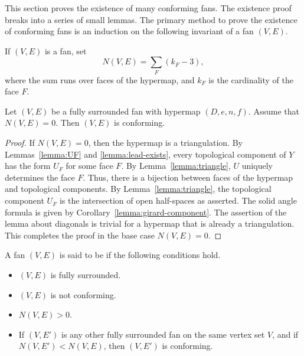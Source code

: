 This section proves the existence of many conforming fans.  The
existence proof breaks into a series of small lemmas.  The primary
method to prove the existence of conforming fans is an induction on
the following invariant of a fan $(V,E)$.

\begin{definition}[$N(V,E)$]
If $(V,E)$ is a fan,  set
\begin{displaymath}
N(V,E) = \sum_F (k_F - 3),
\end{displaymath}
where the sum runs over faces of the hypermap, and $k_F$ is the
cardinality of the face $F$.
\end{definition}

\begin{lemma}\label{lemma:N=0}
Let $(V,E)$ be a fully surrounded fan with hypermap $(D,e,n,f)$. 
Assume that $N(V,E)=0$.
Then $(V,E)$ is conforming.
\end{lemma}
%
%
%

\begin{proof}
If $N(V,E)=0$, then the hypermap is a triangulation.  By
Lemmas~\ref{lemma:UF} and \ref{lemma:lead-exists}, every topological
component of $Y$ has the form $U_F$ for some face $F$.  By
Lemma~\ref{lemma:triangle}, $U$ uniquely determines the face $F$.
Thus, there is a bijection between faces of the hypermap and
topological components.  By Lemma~\ref{lemma:triangle}, the
topological component $U_F$ is the intersection of open half-spaces
as asserted.  The solid angle formula is given by
Corollary~\ref{lemma:girard-component}.  The assertion of the lemma
about diagonals
is trivial for a hypermap that is already a triangulation. This
completes the proof in the base case $N(V,E)=0$.
\end{proof}

\begin{definition}
A fan $(V,E)$ is said to be  if
the following conditions hold.
\begin{itemize}
\item $(V,E)$ is fully surrounded.
\item $(V,E)$ is not conforming.
\item $N(V,E)>0$.
\item If $(V,E')$ is any other fully surrounded fan on the same vertex
set $V$, and if $N(V,E') < N(V,E)$, then $(V,E')$ is conforming.
\end{itemize}
\end{definition}
%

